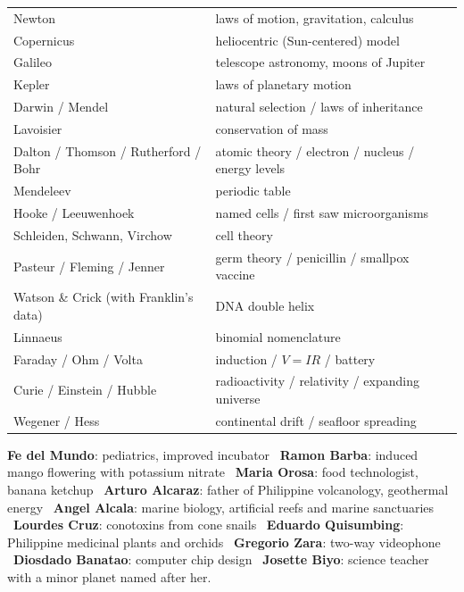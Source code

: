 \documentclass[10pt]{article}
\makeatletter
\renewcommand{\arraystretch}{1.12}
\newcommand{\sub}[1]{\par\vspace{2.5pt}{\sffamily\bfseries\color{dblue}#1}\par\nobreak\vspace{0.5pt}\@afterheading}
\makeatother
\begin{document}
\begin{multicols}{2}
\sub{C. Scientists and their work}
{\footnotesize\renewcommand{\arraystretch}{1.04}
\begin{tabularx}{\linewidth}{@{}>{\raggedright\arraybackslash}p{1.45in}L@{}}
\toprule
Newton & laws of motion, gravitation, calculus\\
Copernicus & heliocentric (Sun-centered) model\\
Galileo & telescope astronomy, moons of Jupiter\\
Kepler & laws of planetary motion\\
Darwin / Mendel & natural selection / laws of inheritance\\
Lavoisier & conservation of mass\\
Dalton / Thomson / Rutherford / Bohr & atomic theory / electron / nucleus / energy levels\\
Mendeleev & periodic table\\
Hooke / Leeuwenhoek & named cells / first saw microorganisms\\
Schleiden, Schwann, Virchow & cell theory\\
Pasteur / Fleming / Jenner & germ theory / penicillin / smallpox vaccine\\
Watson \& Crick (with Franklin's data) & DNA double helix\\
Linnaeus & binomial nomenclature\\
Faraday / Ohm / Volta & induction / $V=IR$ / battery\\
Curie / Einstein / Hubble & radioactivity / relativity / expanding universe\\
Wegener / Hess & continental drift / seafloor spreading\\\bottomrule
\end{tabularx}}
\begin{keybox}
\textbf{Fe del Mundo}: pediatrics, improved incubator \textbullet\ \textbf{Ramon Barba}: induced mango flowering with potassium nitrate \textbullet\ \textbf{Maria Orosa}: food technologist, banana ketchup \textbullet\ \textbf{Arturo Alcaraz}: father of Philippine volcanology, geothermal energy \textbullet\ \textbf{Angel Alcala}: marine biology, artificial reefs and marine sanctuaries \textbullet\ \textbf{Lourdes Cruz}: conotoxins from cone snails \textbullet\ \textbf{Eduardo Quisumbing}: Philippine medicinal plants and orchids \textbullet\ \textbf{Gregorio Zara}: two-way videophone \textbullet\ \textbf{Diosdado Banatao}: computer chip design \textbullet\ \textbf{Josette Biyo}: science teacher with a minor planet named after her.
\end{keybox}


\end{multicols}
\end{document}
